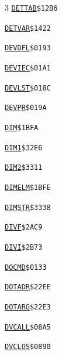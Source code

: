 \begin{multicols}{3}
\noindent\hyperlink{l:DETTAB}{\texttt{DETTAB}}\hfill\texttt{\$12B6~\phantom{000}\llap{\pageref{l:DETTAB}}}\par
\noindent\hyperlink{l:DETVAR}{\texttt{DETVAR}}\hfill\texttt{\$1422~\phantom{000}\llap{\pageref{l:DETVAR}}}\par
\noindent\hyperlink{l:DEVDFL}{\texttt{DEVDFL}}\hfill\texttt{\$0193~\phantom{000}\llap{\pageref{l:DEVDFL}}}\par
\noindent\hyperlink{l:DEVIEC}{\texttt{DEVIEC}}\hfill\texttt{\$01A1~\phantom{000}\llap{\pageref{l:DEVIEC}}}\par
\noindent\hyperlink{l:DEVLST}{\texttt{DEVLST}}\hfill\texttt{\$018C~\phantom{000}\llap{\pageref{l:DEVLST}}}\par
\noindent\hyperlink{l:DEVPR}{\texttt{DEVPR}}\hfill\texttt{\$019A~\phantom{000}\llap{\pageref{l:DEVPR}}}\par
\noindent\hyperlink{l:DIM}{\texttt{DIM}}\hfill\texttt{\$1BFA~\phantom{000}\llap{\pageref{l:DIM}}}\par
\noindent\hyperlink{l:DIM1}{\texttt{DIM1}}\hfill\texttt{\$32E6~\phantom{000}\llap{\pageref{l:DIM1}}}\par
\noindent\hyperlink{l:DIM2}{\texttt{DIM2}}\hfill\texttt{\$3311~\phantom{000}\llap{\pageref{l:DIM2}}}\par
\noindent\hyperlink{l:DIMELM}{\texttt{DIMELM}}\hfill\texttt{\$1BFE~\phantom{000}\llap{\pageref{l:DIMELM}}}\par
\noindent\hyperlink{l:DIMSTR}{\texttt{DIMSTR}}\hfill\texttt{\$3338~\phantom{000}\llap{\pageref{l:DIMSTR}}}\par
\noindent\hyperlink{l:DIVF}{\texttt{DIVF}}\hfill\texttt{\$2AC9~\phantom{000}\llap{\pageref{l:DIVF}}}\par
\noindent\hyperlink{l:DIVI}{\texttt{DIVI}}\hfill\texttt{\$2B73~\phantom{000}\llap{\pageref{l:DIVI}}}\par
\noindent\hyperlink{l:DOCMD}{\texttt{DOCMD}}\hfill\texttt{\$0133~\phantom{000}\llap{\pageref{l:DOCMD}}}\par
\noindent\hyperlink{l:DOTADR}{\texttt{DOTADR}}\hfill\texttt{\$22EE~\phantom{000}\llap{\pageref{l:DOTADR}}}\par
\noindent\hyperlink{l:DOTARG}{\texttt{DOTARG}}\hfill\texttt{\$22E3~\phantom{000}\llap{\pageref{l:DOTARG}}}\par
\noindent\hyperlink{l:DVCALL}{\texttt{DVCALL}}\hfill\texttt{\$08A5~\phantom{000}\llap{\pageref{l:DVCALL}}}\par
\noindent\hyperlink{l:DVCLOS}{\texttt{DVCLOS}}\hfill\texttt{\$0890~\phantom{000}\llap{\pageref{l:DVCLOS}}}\par

\end{multicols}
